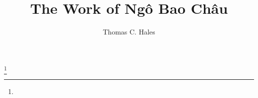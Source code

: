 \documentclass[11pt]{amsart} %
\begin{document}
\title{The Work of Ng\^o Bao Ch\^au}
\author{Thomas C. Hales} %
\thanks{}
\maketitle








\raggedright



\end{document}
